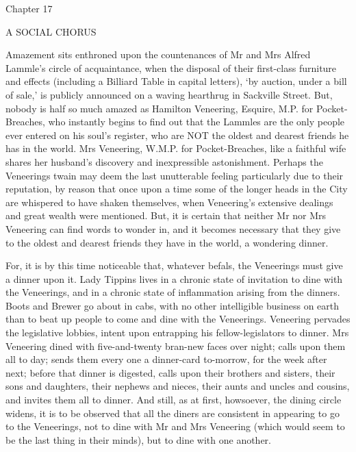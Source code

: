 Chapter 17

A SOCIAL CHORUS


Amazement sits enthroned upon the countenances of Mr and Mrs Alfred
Lammle’s circle of acquaintance, when the disposal of their first-class
furniture and effects (including a Billiard Table in capital letters),
‘by auction, under a bill of sale,’ is publicly announced on a waving
hearthrug in Sackville Street. But, nobody is half so much amazed as
Hamilton Veneering, Esquire, M.P. for Pocket-Breaches, who instantly
begins to find out that the Lammles are the only people ever entered on
his soul’s register, who are NOT the oldest and dearest friends he has
in the world. Mrs Veneering, W.M.P. for Pocket-Breaches, like a faithful
wife shares her husband’s discovery and inexpressible astonishment.
Perhaps the Veneerings twain may deem the last unutterable feeling
particularly due to their reputation, by reason that once upon a time
some of the longer heads in the City are whispered to have shaken
themselves, when Veneering’s extensive dealings and great wealth were
mentioned. But, it is certain that neither Mr nor Mrs Veneering can
find words to wonder in, and it becomes necessary that they give to the
oldest and dearest friends they have in the world, a wondering dinner.

For, it is by this time noticeable that, whatever befals, the Veneerings
must give a dinner upon it. Lady Tippins lives in a chronic state
of invitation to dine with the Veneerings, and in a chronic state of
inflammation arising from the dinners. Boots and Brewer go about in
cabs, with no other intelligible business on earth than to beat up
people to come and dine with the Veneerings. Veneering pervades the
legislative lobbies, intent upon entrapping his fellow-legislators to
dinner. Mrs Veneering dined with five-and-twenty bran-new faces over
night; calls upon them all to day; sends them every one a dinner-card
to-morrow, for the week after next; before that dinner is digested,
calls upon their brothers and sisters, their sons and daughters, their
nephews and nieces, their aunts and uncles and cousins, and invites
them all to dinner. And still, as at first, howsoever, the dining circle
widens, it is to be observed that all the diners are consistent in
appearing to go to the Veneerings, not to dine with Mr and Mrs Veneering
(which would seem to be the last thing in their minds), but to dine with
one another.

